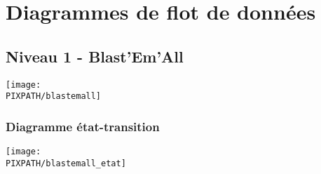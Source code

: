 \section{Diagrammes de flot de données}

\subsection{Niveau 1 - Blast'Em'All}

\begin{center}
\texttt{[image: \\PIXPATH/blastemall]}
\end{center}

\vfill

\subsubsection{Diagramme état-transition}

\begin{center}
\texttt{[image: \\PIXPATH/blastemall\_etat]}
\end{center}

\vfill
\pagebreak


